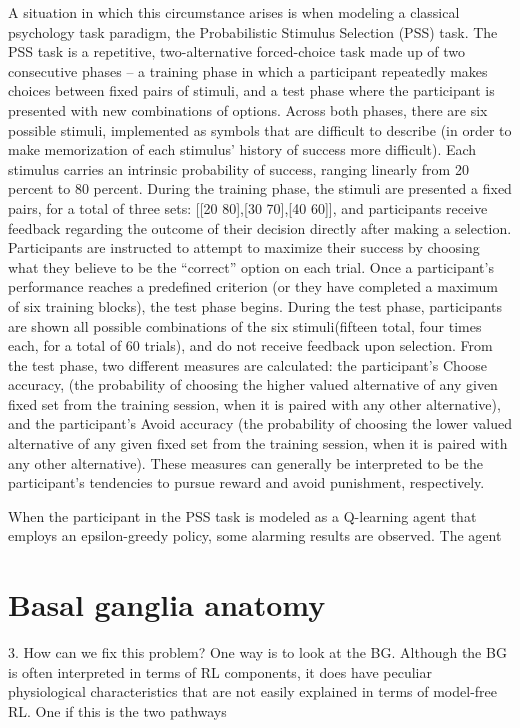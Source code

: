 \documentclass[11pt]{article} %
\begin{document}
A situation in which this circumstance arises is when modeling a classical psychology task paradigm, the Probabilistic Stimulus Selection (PSS) task. The PSS task is a repetitive, two-alternative forced-choice task made up of two consecutive phases – a training phase in which a participant repeatedly makes choices between fixed pairs of stimuli, and a test phase where the participant is presented with new combinations of options. Across both phases, there are six possible stimuli, implemented as symbols that are difficult to describe (in order to make memorization of each stimulus’ history of success more difficult). Each stimulus carries an intrinsic probability of success, ranging linearly from 20 percent to 80 percent. During the training phase, the stimuli are presented a fixed pairs, for a total of three sets: [[20 80],[30 70],[40 60]], and participants receive feedback regarding the outcome of their decision directly after making a selection. Participants are instructed to attempt to maximize their success by choosing what they believe to be the “correct” option on each trial. Once a participant’s performance reaches a predefined criterion (or they have completed a maximum of six training blocks), the test phase begins. During the test phase, participants are shown all possible combinations of the six stimuli(fifteen total, four times each, for a total of 60 trials), and do not receive feedback upon selection. From the test phase, two different measures are calculated: the participant’s Choose accuracy, (the probability of choosing the higher valued alternative of any given fixed set from the training session, when it is paired with any other alternative), and the participant’s Avoid accuracy (the probability of choosing the lower valued alternative of any given fixed set from the training session, when it is paired with any other alternative). These measures can generally be interpreted to be the participant’s tendencies to pursue reward and avoid punishment, respectively.

When the participant in the PSS task is modeled as a Q-learning agent that employs an epsilon-greedy policy, some alarming results are observed. The agent 


\section{Basal ganglia anatomy}

3. How can we fix this problem? One way is to look at the BG. Although the BG is often interpreted in terms of RL components, it does have peculiar physiological characteristics that are not easily explained in terms of model-free RL.  One if this is the two pathways
\end{document}
